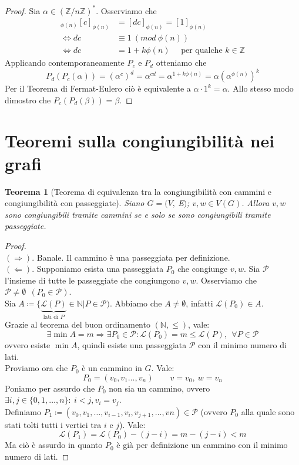 \documentclass[12pt]{article}
\newcommand{\N}{\mathbb{N}}
\newcommand{\Z}{\mathbb{Z}}
\newcommand{\sesolose}{\Leftrightarrow}
\newcommand{\implica}{\Longrightarrow}
\newcommand{\pq}{\text{ per qualche }}
\newcommand{\znz}{\displaystyle({\Z}/{n\Z})^*}
\newcommand{\Eps}{$E\:$}
\newcommand{\grafo}{(V, \: \Eps)}
\newtheorem{theorem}{Teorema}
\begin{document}
\begin{proof}
	Sia $\alpha \in \znz$. Osserviamo che
	\begin{align*}
		[d]_{\phi(n)}[c]_{\phi(n)} & = [dc]_{\phi(n)} = [1]_{\phi(n)} \\
		\sesolose dc               & \equiv 1 \ (mod \ \phi(n))       \\
		\sesolose dc               & = 1 + k\phi(n)\quad \pq k \in \Z
	\end{align*}
	Applicando contemporaneamente $P_c$ e $P_d$ otteniamo che
	$$ P_d(P_c(\alpha)) = (\alpha^c)^d = \alpha^{cd} = \alpha^{1+k\phi(n)} = \alpha(\alpha^{\phi(n)})^{k} $$
	Per il Teorema di Fermat-Eulero ciò è equivalente a $\alpha \cdot 1^k = \alpha$. Allo stesso modo dimostro che $P_c(P_d(\beta)) = \beta$.
\end{proof}

\section{Teoremi sulla congiungibilità nei grafi}
\begin{theorem}[Teorema di equivalenza tra la congiungibilità con cammini e congiungibilità con passeggiate]
	Siano $G = \grafo$; $v, w \in V(G)$. Allora $v, w$ sono congiungibili tramite cammini se e solo se sono congiungibili tramite passeggiate.
\end{theorem}

\begin{proof}\ \\
	$(\implica)$. Banale. Il cammino è una passeggiata per definizione.\\
	$(\Longleftarrow)$. Supponiamo esista una passeggiata $P_0$ che congiunge $v, w$. Sia $\mathcal{P}$ l'insieme di tutte le passeggiate che congiungono $v, w$. Osserviamo che $\mathcal{P} \ne \emptyset \ \ (P_0 \in \mathcal{P})$.\\
	Sia $A \coloneqq \{ \underbrace{\mathcal{L}(P)}_{\text{lati di $P$}} \in \N | P \in \mathcal{P})$. Abbiamo che $A \ne \emptyset$, infatti $\mathcal{L}(P_0) \in A$.\\
	Grazie al teorema del buon ordinamento $(\N, \le)$, vale:
	$$ \exists \min A = m \implica \exists P_0 \in \mathcal{P} : \mathcal{L}(P_0) = m \le \mathcal{L}(P),\ \ \forall P \in \mathcal{P}$$
	ovvero esiste $\min A$, quindi esiste una passeggiata $\mathcal{P}$ con il minimo numero di lati.\\
	Proviamo ora che $P_0$ è un cammino in $G$. Vale:
	$$ P_0 = (v_0, v_1\ldots, v_n)\qquad v = v_0,\ w = v_n$$
	Poniamo per assurdo che $P_0$ non sia un cammino, ovvero $\exists i, j \in \{0, 1,\ldots, n\} : \ i < j, v_i = v_j$.\\
	Definiamo $P_1 \coloneqq (v_0, v_1, \ldots , v_{i-1}, v_i, v_{j+1},\ldots, vn) \in \mathcal{P}$ (ovvero $P_0$ alla quale sono stati tolti tutti i vertici tra $i$ e $j$). Vale:
	$$\mathcal{L}(P_1) = \mathcal{L}(P_0) - (j - i) = m - (j - i) < m$$
	Ma ciò è assurdo in quanto $P_0$ è già per definizione un cammino con il minimo numero di lati.
\end{proof}
\end{document}
